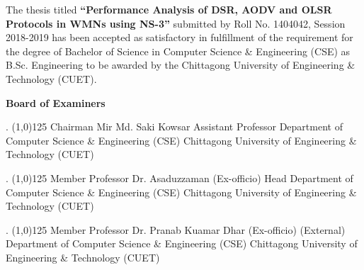 \justify
The thesis titled \textbf{“Performance Analysis of DSR,  AODV and OLSR Protocols in WMNs using NS-3”} submitted by Roll No. 1404042, Session 2018-2019 has been accepted as satisfactory in fulfillment of the requirement for the degree of Bachelor of Science in Computer Science \& Engineering (CSE) as B.Sc. Engineering to be awarded by the Chittagong University of Engineering \& Technology (CUET).

\vspace{20mm}
\begin{center}
{\Large \textbf{Board of Examiners}}
\end{center}

\vspace{10mm} 
. \line(1,0){125} \hfill Chairman  \newline
Mir Md. Saki Kowsar \newline
Assistant Professor \newline
Department of Computer Science \& Engineering (CSE) \newline
Chittagong University of Engineering \& Technology (CUET) \newline


\vspace{10mm} 
. \line(1,0){125} \hfill Member  \newline
Professor Dr. Asaduzzaman \hfill (Ex-officio) \newline
Head \newline
Department of Computer Science \& Engineering (CSE) \newline
Chittagong University of Engineering \& Technology (CUET) \newline

\vspace{10mm} 
. \line(1,0){125} \hfill Member  \newline
Professor Dr. Pranab Kuamar Dhar \hfill (Ex-officio) \newline
(External) \newline
\newline
Department of Computer Science \& Engineering (CSE) \newline
Chittagong University of Engineering \& Technology (CUET) \newline




